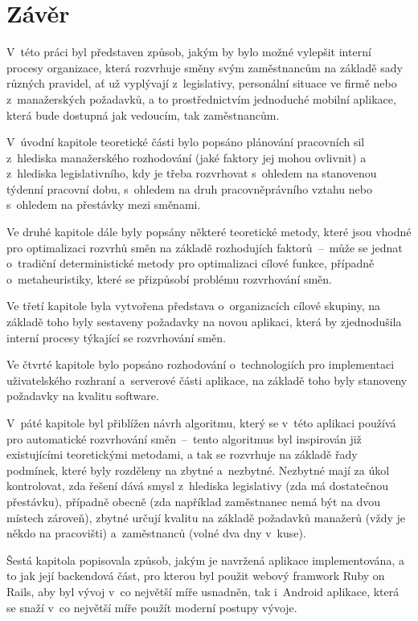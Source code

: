\documentclass[a4paper,11pt,openany,twoside]{book}
\begin{document}
\chapter*{Závěr}

V~této práci byl představen způsob, jakým by bylo možné vylepšit interní procesy organizace, která rozvrhuje směny svým zaměstnancům na základě sady různých pravidel, ať už vyplývají z~legislativy, personální situace ve firmě nebo z~manažerských požadavků, a to prostřednictvím jednoduché mobilní aplikace, která bude dostupná jak vedoucím, tak zaměstnancům.

V~úvodní kapitole teoretické části bylo popsáno plánování pracovních sil z~hlediska manažerského rozhodování (jaké faktory jej mohou ovlivnit) a z~hlediska legislativního, kdy je třeba rozvrhovat s~ohledem na stanovenou týdenní pracovní dobu, s~ohledem na druh pracovněprávního vztahu nebo s~ohledem na přestávky mezi směnami.

Ve druhé kapitole dále byly popsány některé teoretické metody, které jsou vhodné pro optimalizaci rozvrhů směn na základě rozhodujích faktorů~–~může se jednat o~tradiční deterministické metody pro optimalizaci cílové funkce, případně o~metaheuristiky, které se přizpůsobí problému rozvrhování směn.

Ve třetí kapitole byla vytvořena představa o~organizacích cílové skupiny, na základě toho byly sestaveny požadavky na novou aplikaci, která by zjednodušila interní procesy týkající se rozvrhování směn.

Ve čtvrté kapitole bylo popsáno rozhodování o~technologiích pro implementaci uživatelského rozhraní a~serverové části aplikace, na základě toho byly stanoveny požadavky na kvalitu software.

V~páté kapitole byl přiblížen návrh algoritmu, který se v~této aplikaci používá pro automatické rozvrhování směn~–~tento algoritmus byl inspirován již existujícími teoretickými metodami, a tak se rozvrhuje na základě řady podmínek, které byly rozděleny na zbytné a~nezbytné. Nezbytné mají za úkol kontrolovat, zda řešení dává smysl z~hlediska legislativy (zda má dostatečnou přestávku), případně obecně (zda například zaměstnanec nemá být na dvou místech zároveň), zbytné určují kvalitu na základě požadavků manažerů (vždy je někdo na pracovišti) a~zaměstnanců (volné dva dny v~kuse).

Šestá kapitola popisovala způsob, jakým je navržená aplikace implementována, a to jak její backendová část, pro kterou byl použit webový framwork Ruby on Rails, aby byl vývoj v~co největší míře usnadněn, tak i~Android aplikace, která se snaží v~co největší míře použít moderní postupy vývoje.
\end{document}
